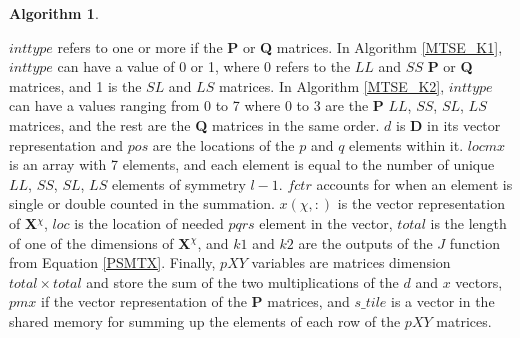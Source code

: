 \documentclass[12pt]{report}
\newtheorem{algorithm}[theorem]{Algorithm}
\begin{document}
\begin{algorithm}
\caption{Kernel 2 for MTSE}
\label{MTSE_K2}
\begin{algorithmic}


	\ELSE
	\ENDIF
	\ELSE
	\ENDIF
\ELSE
{}
\ENDIF
{}
	\ENDIF
\ENDFOR	 
{}
	
	\ELSE
	\ENDIF	
\ENDIF

\end{algorithmic}
\end{algorithm}

$inttype$ refers to one or more if the \textbf{P} or \textbf{Q} matrices. In Algorithm \ref{MTSE_K1}, $inttype$ can have a value of 0 or 1, where 0 refers to the $LL$ and $SS$ \textbf{P} or \textbf{Q} matrices, and 1 is the $SL$ and $LS$ matrices.  In Algorithm \ref{MTSE_K2}, $inttype$ can have a values ranging from 0 to 7 where 0 to 3 are the \textbf{P} $LL$, $SS$, $SL$, $LS$ matrices, and the rest are the \textbf{Q} matrices in the same order. $d$ is \textbf{D} in its vector representation and $pos$ are the locations of the $p$ and $q$ elements within it. $locmx$ is an array with 7 elements, and each element is equal to the number of unique $LL$, $SS$, $SL$, $LS$ elements of symmetry $l-1$. $fctr$ accounts for when an element is single or double counted in the summation. $x(\chi, :)$ is the vector representation of \textbf{X$^{\chi}$}, $loc$ is the location of needed $pqrs$ element in the vector, $total$ is the length of one of the dimensions of \textbf{X$^{\chi}$}, and $k1$ and $k2$ are the outputs of the $J$ function from Equation \ref{PSMTX}. Finally, $pXY$ variables are matrices dimension $total \times total$ and store the sum of the two multiplications of the $d$ and $x$ vectors, $pmx$ if the vector representation of the \textbf{P} matrices, and $s\_tile$ is a vector in the shared memory for summing up the elements of each row of the $pXY$ matrices. 
\end{document}
